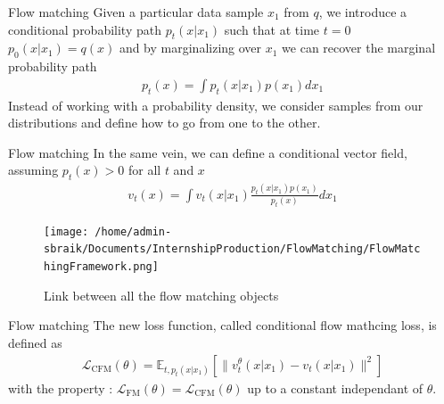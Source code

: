 \documentclass{beamer}
\begin{document}
\begin{frame}{Flow matching}
    Given a particular data sample \(x_1\) from \(q\), we introduce a conditional probability path \(p_t(x|x_1)\) such that at time \(t=0\) \(p_0(x|x_1)=q(x)\) and by marginalizing over \(x_1\) we can recover the marginal probability path 
    \begin{align}
        p_t(x)=\int p_t(x|x_1)p(x_1)dx_1
    \end{align}
    Instead of working with a probability density, we consider samples from our distributions and define how to go from one to the other.\\
\end{frame}
    
\begin{frame}{Flow matching}
    In the same vein, we can define a conditional vector field, assuming \(p_t(x)>0\) for all \(t\) and \(x\)
    \begin{align}
        v_t(x)=\int v_t(x|x_1)\frac{p_t(x|x_1)p(x_1)}{p_t(x)}dx_1
    \end{align}
\end{frame}

\begin{frame}
\begin{figure}
    \centering
    \texttt{[image: /home/admin-sbraik/Documents/InternshipProduction/FlowMatching/FlowMatchingFramework.png]}
    \caption{Link between all the flow matching objects}
    \label{fig:flow_matching_full}
\end{figure}
\end{frame}

\begin{frame}{Flow matching}
    The new loss function, called conditional flow mathcing loss, is defined as
    \begin{align}
        \mathcal{L}_\text{CFM}(\theta)=\mathbb{E}_{t,p_t(x|x_1)}\left[ \| v_t^\theta(x|x_1)-v_t(x|x_1)\|^2 \right]
    \end{align}
    with the property : \( \mathcal{L}_\text{FM}(\theta)=\mathcal{L}_\text{CFM}(\theta) \) up to a constant independant of \(\theta\).
\end{frame}
\end{document}
